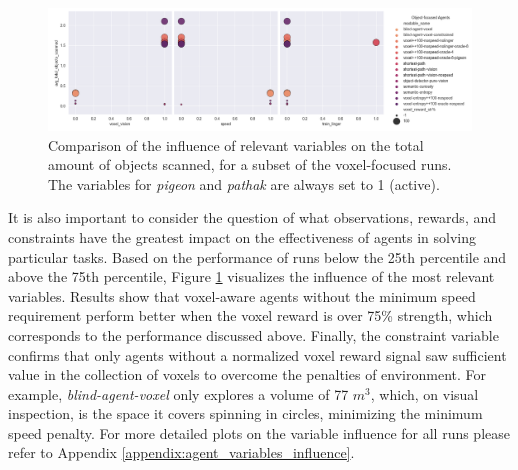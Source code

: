         
        \begin{figure}[!ht]
        \centering
        \includegraphics[width=1\textwidth]{images/results_variables_obj3.png} 
        \caption{Comparison of the influence of relevant variables on the total amount of objects scanned, for a subset of the voxel-focused runs. The variables for \textit{pigeon} and \textit{pathak} are always set to 1 (active).}
        \label{fig:results_variables_obj}
        \end{figure}
        
        It is also important to consider the question of what observations, rewards, and constraints have the greatest impact on the effectiveness of agents in solving particular tasks.
        Based on the performance of runs below the 25th percentile and above the 75th percentile, Figure \ref{fig:results_variables_obj} visualizes the influence of the most relevant variables. 
        Results show that voxel-aware agents without the minimum speed requirement perform better when the voxel reward is over 75\% strength, which corresponds to the performance discussed above.
        Finally, the constraint variable confirms that only agents without a normalized voxel reward signal saw sufficient value in the collection of voxels to overcome the penalties of environment. 
        For example, \textit{blind-agent-voxel} only explores a volume of 77 $m^3$, which, on visual inspection, is the space it covers spinning in circles, minimizing the minimum speed penalty. For more detailed plots on the variable influence for all runs please refer to Appendix \ref{appendix:agent_variables_influence}.
  
    
